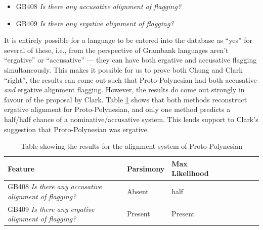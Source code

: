 \documentclass[a4paper,10pt]{article} %
\begin{document}
\begin{itemize}
\item GB408 \emph{Is there any accusative alignment of flagging?}
\item GB409 \emph{Is there any ergative alignment of flagging?}
\end{itemize}

It is entirely possible for a language to be entered into the database as ``yes'' for several of these, i.e., from the perspective of Grambank languages aren't ``ergative'' or ``accusative'' --- they can have both ergative and accusative flagging simultaneously. This makes it possible for us to prove both Chung and Clark ``right'', the results can come out such that Proto-Polynesian had both accusative \emph{and} ergative alignment flagging. However, the results do come out strongly in favour of the proposal by Clark. Table \ref{proto_poly_erg_table} shows that both methods reconstruct ergative alignment for Proto-Polynesian, and only one method predicts a half/half chance of a nominative/accusative system. This lends support to Clark's suggestion that Proto-Polynesian was ergative.

\begin{table}[H]
\centering
\caption{Table showing the results for the alignment system of Proto-Polynesian}
\label{proto_poly_erg_table}
\begin{tabular}{|l|l|l|l|l|l|l|l|}
\hline
Feature & \textbf{Parsimony}& \textbf{Max Likelihood} \\ \hline
GB408 \emph{Is there any accusative alignment of flagging?} &Absent & half \\
GB409 \emph{Is there any ergative alignment of flagging?} & Present & Present \\
\end{tabular}
\end{table}
\end{document}
